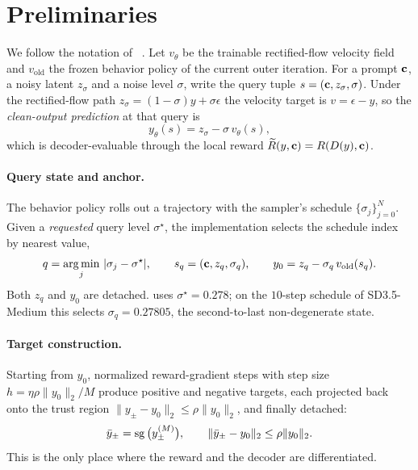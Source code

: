 \section{Preliminaries}
\label{sec:prelim}

We follow the notation of \opsd~\citep{opsd2026}. Let $v_\theta$ be the trainable
rectified-flow velocity field and $v_{\mathrm{old}}$ the frozen behavior policy of the
current outer iteration. For a prompt $\mathbf{c}$, a noisy latent $z_\sigma$ and a noise level
$\sigma$, write the query tuple $s=(\mathbf{c},z_\sigma,\sigma)$. Under the rectified-flow path
$z_\sigma=(1-\sigma)y+\sigma\epsilon$ the velocity target is $v=\epsilon-y$, so the
\emph{clean-output prediction} at that query is
\begin{equation}
y_\theta(s)=z_\sigma-\sigma\,v_\theta(s),
\label{eq:clean}
\end{equation}
which is decoder-evaluable through the local reward
$\widetilde R(y,\mathbf{c})=R(D(y),\mathbf{c})$.

\paragraph{Query state and anchor.} The behavior policy rolls out a trajectory with the
sampler's schedule $\{\sigma_j\}_{j=0}^{N}$. Given a \emph{requested} query level
$\sigma^\star$, the implementation selects the schedule index by nearest value,
\begin{equation}
q=\operatorname*{arg\,min}_j\,|\sigma_j-\sigma^\star|,
\qquad
s_q=(\mathbf{c},z_q,\sigma_q),
\qquad
y_0=z_q-\sigma_q\,v_{\mathrm{old}}(s_q).
\label{eq:query}
\end{equation}
Both $z_q$ and $y_0$ are detached. \opsd uses $\sigma^\star=0.278$; on the $10$-step
schedule of SD3.5-Medium this selects $\sigma_q=0.27805$, the second-to-last
non-degenerate state.

\paragraph{Target construction.} Starting from $y_0$, normalized reward-gradient steps
with step size $h=\eta\rho\|y_0\|_2/M$ produce positive and negative targets, each
projected back onto the trust region $\|y_\pm-y_0\|_2\le\rho\|y_0\|_2$, and finally
detached:
\begin{equation}
\bar y_\pm=\operatorname{sg}\big(y_\pm^{(M)}\big),\qquad
\|\bar y_\pm-y_0\|_2\le\rho\|y_0\|_2 .
\label{eq:targets}
\end{equation}
This is the only place where the reward and the decoder are differentiated.

